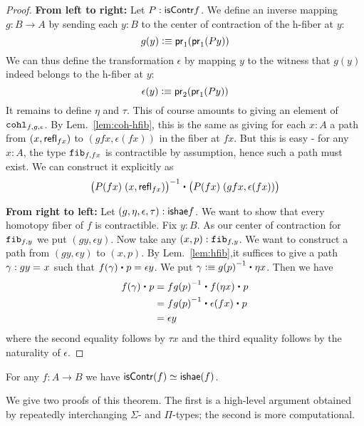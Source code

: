 \begin{proof}
\textbf{From left to right:}
Let $P : \mathsf{isContr}{f}$. We define an inverse mapping $g : B \to A$ by sending each $y : B$ to the center of contraction of the h-fiber at $y$:
\[ g(y) \vcentcolon\equiv \mathsf{pr}_{1}(\mathsf{pr}_{1}(Py)) \]
We can thus define the transformation $\epsilon$ by mapping $y$ to the witness that $g(y)$ indeed belongs to the h-fiber at $y$:
\[ \epsilon(y) \vcentcolon\equiv \mathsf{pr}_{2}(\mathsf{pr}_{1}(P y)) \]
It remains to define $\eta$ and $\tau$. This of course amounts to giving an element of $\mathtt{cohl}_{f, g, \epsilon}$. By Lem.~\ref{lem:coh-hfib}, this is the same as giving for each $x:A$ a path from $(x,\mathsf{refl}_{fx})$ to $(gfx,\epsilon(fx))$ in the fiber at $fx$. But this is easy - for any $x : A$, the type $\mathtt{fib}_{f,fx}$ 
is contractible by assumption, hence such a path must exist. We can construct it explicitly as
\[\opp{\big(P(fx) \; (x,\refl{fx})\big)} \ct \big(P(fx) \; (gfx,\epsilon(fx))\big) \]

\bigskip 

\textbf{From right to left:}
Let $(g,\eta,\epsilon,\tau) : \mathsf{ishae}{f}$. We want to show that every homotopy fiber of $f$ is contractible. Fix $y : B$. As our center of contraction for $\mathtt{fib}_{f,y}$ we put $(gy, \epsilon y)$. Now take any $(x,p) : \mathtt{fib}_{f,y}$. We want to construct a path from $(gy, \epsilon y)$ to $(x,p)$. By Lem.~\ref{lem:hfib},it suffices to give a path $\gamma : gy =_{} x$ such that $f(\gamma) \ct p = \epsilon y$. We put $\gamma \defeq \opp{g(p)} \ct \eta x$.
Then we have 
\begin{align*}
f(\gamma) \ct p & = \opp{fg(p)} \ct f (\eta x) \ct p \\
& = \opp{fg(p)} \ct \epsilon(fx) \ct p \\
& = \epsilon y
\end{align*}
where the second equality follows by $\tau x$ and the third equality follows by the naturality of $\epsilon$.
\end{proof}

\begin{thm}\label{thm:equiv-contr-hae}
  For any $f:A\to B$ we have $\mathsf{isContr}(f) \simeq \mathsf{ishae}(f)$.
\end{thm}

We give two proofs of this theorem.
The first is a high-level argument obtained by repeatedly interchanging $\Sigma$- and $\Pi$-types; the second is more computational.


